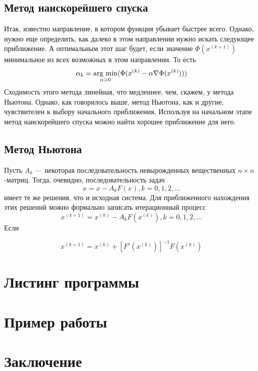 \documentclass[a4paper, 12pt]{article}
\newcommand{\argmin}{\mathop{\rm arg~min}\limits}
\begin{document}
\subsection*{Метод наискорейшего спуска}
Итак, известно направление, в котором функция убывает быстрее всего. Однако, нужно
еще определить, как далеко в этом направлении нужно искать следующее приближение.
А оптимальным этот шаг будет, если значение $\Phi(x^{(k+1)})$ минимальное из всех возможных в этом направлении.
То есть 
\begin{equation}
	\alpha_k = \argmin_{\alpha > 0} (\Phi(x^{(k)} - \alpha \nabla \Phi(x^{(k)})))
\end{equation}
Сходимость этого метода линейная, что медленнее, чем, скажем, у метода Ньютона. Однако, как
говорилось выше, метод Ньютона, как и другие, чувствителен к выбору начального приближения.
Используя на начальном этапе метод наискорейшего спуска можно найти хорошее приближение для него.

\subsection*{Метод Ньютона}
Пусть $A_k$ --- некоторая последовательность невырожденных вещественных $n \times n$-матриц. Тогда, очевидно, последовательность задач
\begin{equation}
	x = x - A_k F(x), k=0,1,2,\ldots
\end{equation}
имеет те же решения, что и исходная система. Для приближенного нахождения этих решений можно формально 
записать итерационный процесс 
\begin{equation}
	x^{(k+1)} = x^{(k)} - A_k F(x^{(k)}), k=0,1,2,\ldots
\end{equation}
Если $$

\begin{equation}
	x^{(k+1)} = x^{(k)} + [F'(x^{(k)})]^{-1} F(x^{(k)})
\end{equation}
\newpage
\section*{Листинг программы}
\newpage
\section*{Пример работы}
\newpage
\section*{Заключение}
\newpage
\end{document}
